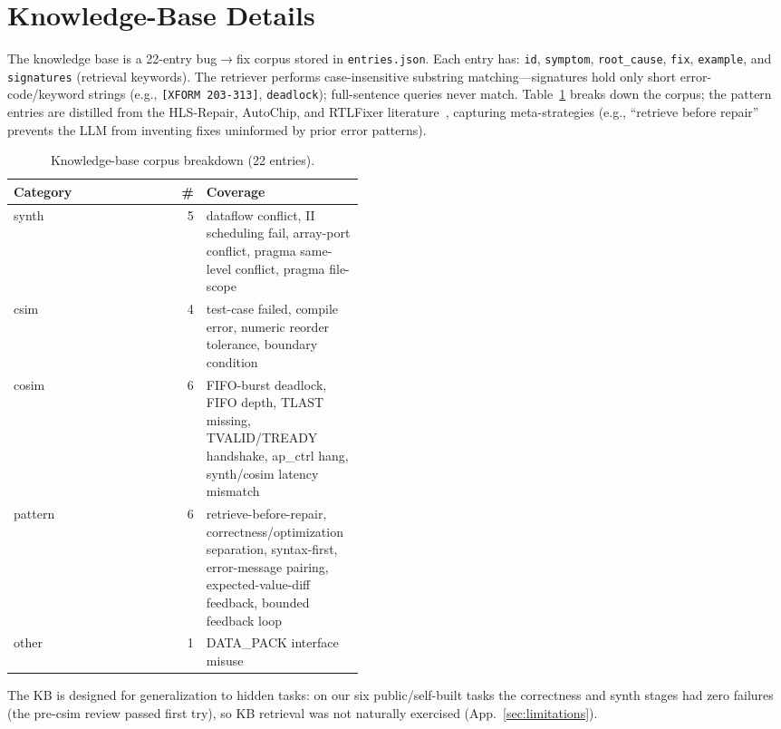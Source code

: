 \documentclass[10pt,conference,letterpaper]{IEEEtran}
\begin{document}
\section{Knowledge-Base Details}
\label{app:kb}

The knowledge base is a 22-entry bug$\to$fix corpus stored in \texttt{entries.json}. Each entry has: \texttt{id}, \texttt{symptom}, \texttt{root\_cause}, \texttt{fix}, \texttt{example}, and \texttt{signatures} (retrieval keywords). The retriever performs case-insensitive substring matching---signatures hold only short error-code/keyword strings (e.g., \texttt{[XFORM 203-313]}, \texttt{deadlock}); full-sentence queries never match. Table~\ref{tab:kb} breaks down the corpus; the pattern entries are distilled from the HLS-Repair, AutoChip, and RTLFixer literature~\cite{hlsrepair,autochip,rtlfixer}, capturing meta-strategies (e.g., ``retrieve before repair'' prevents the LLM from inventing fixes uninformed by prior error patterns).

\begin{table}[h]
\centering
\caption{Knowledge-base corpus breakdown (22 entries).}
\label{tab:kb}
\small
\begin{tabular}{lr p{0.45\linewidth}}
\toprule
\textbf{Category} & \textbf{\#} & \textbf{Coverage} \\
\midrule
synth & 5 & dataflow conflict, II scheduling fail, array-port conflict, pragma same-level conflict, pragma file-scope \\
csim & 4 & test-case failed, compile error, numeric reorder tolerance, boundary condition \\
cosim & 6 & FIFO-burst deadlock, FIFO depth, TLAST missing, TVALID/TREADY handshake, ap\_ctrl hang, synth/cosim latency mismatch \\
pattern & 6 & retrieve-before-repair, correctness/optimization separation, syntax-first, error-message pairing, expected-value-diff feedback, bounded feedback loop \\
other & 1 & DATA\_PACK interface misuse \\
\bottomrule
\end{tabular}
\end{table}

The KB is designed for generalization to hidden tasks: on our six public/self-built tasks the correctness and synth stages had zero failures (the pre-csim review passed first try), so KB retrieval was not naturally exercised (App.~\ref{sec:limitations}).
\end{document}
